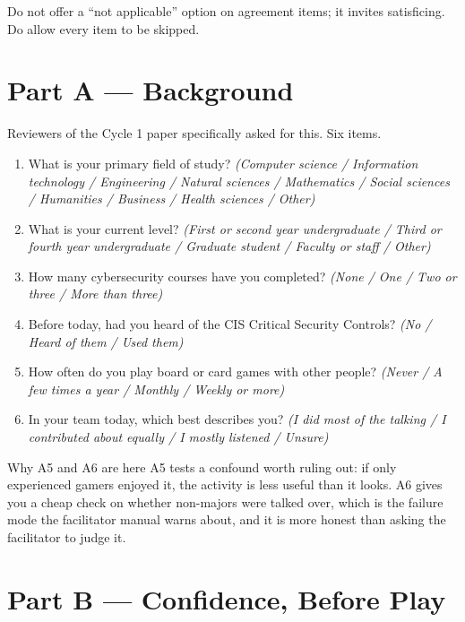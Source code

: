 \documentclass[11pt,letterpaper]{article}
\begin{document}
Do not offer a ``not applicable'' option on agreement items; it invites
satisficing. Do allow every item to be skipped.

\section{Part A --- Background}

Reviewers of the Cycle 1 paper specifically asked for this. Six items.

\begin{enumerate}[label=A\arabic*.]
\item What is your primary field of study? \emph{(Computer science / Information
technology / Engineering / Natural sciences / Mathematics / Social sciences /
Humanities / Business / Health sciences / Other)}
\item What is your current level? \emph{(First or second year undergraduate /
Third or fourth year undergraduate / Graduate student / Faculty or staff /
Other)}
\item How many cybersecurity courses have you completed? \emph{(None / One /
Two or three / More than three)}
\item Before today, had you heard of the CIS Critical Security Controls?
\emph{(No / Heard of them / Used them)}
\item How often do you play board or card games with other people?
\emph{(Never / A few times a year / Monthly / Weekly or more)}
\item In your team today, which best describes you? \emph{(I did most of the
talking / I contributed about equally / I mostly listened / Unsure)}
\end{enumerate}

\begin{note}{Why A5 and A6 are here}
A5 tests a confound worth ruling out: if only experienced gamers enjoyed it, the
activity is less useful than it looks. A6 gives you a cheap check on whether
non-majors were talked over, which is the failure mode the facilitator manual
warns about, and it is more honest than asking the facilitator to judge it.
\end{note}

\section{Part B --- Confidence, Before Play}
\end{document}
